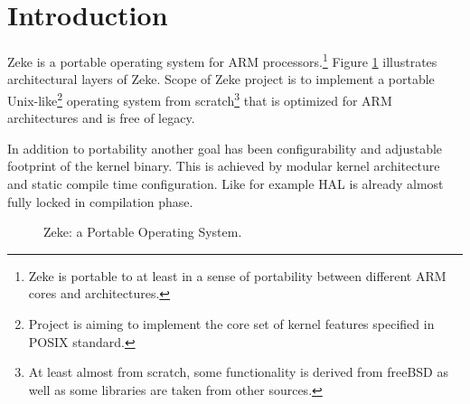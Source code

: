\part{Introduction}

Zeke is a portable operating system for ARM processors.\footnote{Zeke is
portable to at least in a sense of portability between different ARM cores
and architectures.} Figure \ref{figure:zeke} illustrates architectural layers
of Zeke. Scope of Zeke project is to implement a portable
Unix-like\footnote{Project is aiming to implement the core set of kernel
features specified in \ac{POSIX} standard.} operating system from
scratch\footnote{At least almost from scratch, some functionality is derived
from freeBSD as well as some libraries are taken from other sources.} that
is optimized for ARM architectures and is free of legacy.

In addition to portability another goal has been configurability and adjustable
footprint of the kernel binary. This is achieved by modular kernel architecture
and static compile time configuration. Like for example \ac{HAL} is already
almost fully locked in compilation phase.

\begin{figure}
  
  \centering
  \caption{Zeke: a Portable Operating System.}
  \label{figure:zeke}
\end{figure}

